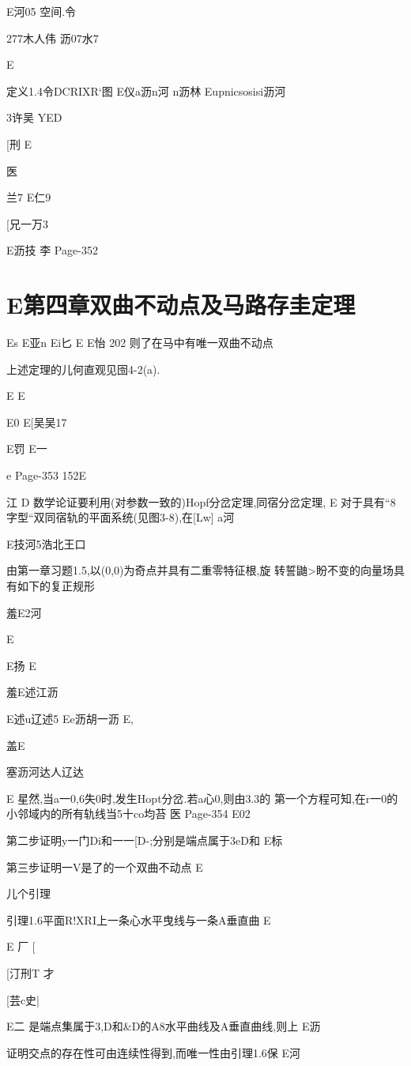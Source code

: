 {{{{{{{{{{{{{{{{{{{E河05
空间.令

277木人伟
沥07水7

E

定义1.4令DCRIXR`图
E仪a沥n河
n沥林
Eupnicsosisi沥河

3许吴
YED

[刑
E

医

兰7
E仁9

[兄一万3

E沥技
李
Page-352

\part{E第四章双曲不动点及马路存圭定理}

Es
E亚n
Ei匕
E
E怡
202
则了在马中有唯一双曲不动点

上述定理的儿何直观见囹4-2(a).

E
E

E0
E[吴吴17

E罚
E一

e
Page-353
152E

江
D
数学论证要利用(对参数一致的)Hopf分岔定理,同宿分岔定理,
E
对于具有“8字型“双同宿轨的平面系统(见图3-8),在[Lw]
a河

E技河5浩北王口

由第一章习题1.5,以(0,0)为奇点并具有二重零特征根,旋
转誓鼬>盼不变的向量场具有如下的复正规形

羞E2河

E

E扬
E

羞E述江沥

E述u辽述5
Ee沥胡一沥
E,

盖E

塞沥河达人辽达

E
星然,当a一0,6失0时,发生Hopt分岔.若a心0,则由3.3的
第一个方程可知,在r一0的小邻域内的所有轨线当5十co均苔
医
Page-354
E02

第二步证明y一门Di和一一[D-;分别是端点属于3eD和
E标

第三步证明一V是了的一个双曲不动点
E

儿个引理

引理1.6平面R!XRI上一条心水平曳线与一条A垂直曲
E

E
厂
[

[汀刑T
才

[芸c史|

E二
是端点集属于3,D和&D的A8水平曲线及A垂直曲线,则上
E沥

证明交点的存在性可由连续性得到,而唯一性由引理1.6保
E河

}}}}}}}}}}}}}}}}}}}
